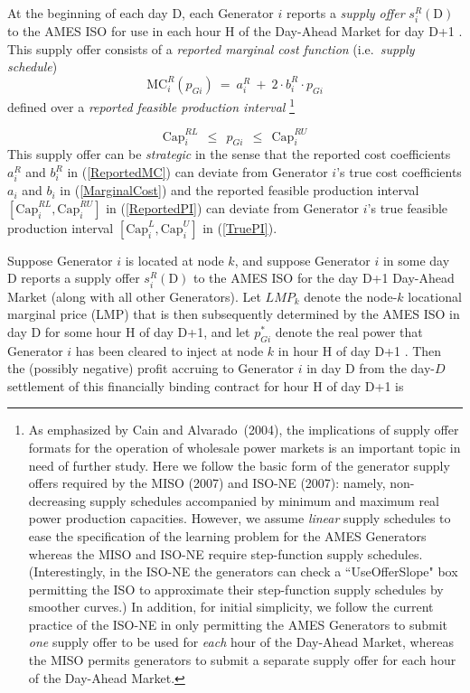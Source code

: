 \documentclass[12pt]{article}
\begin{document}
At the beginning of each day D, each Generator $i$ reports a \textit{supply offer\/} $s^R_i(\mbox{D})$ to the AMES ISO for use in each hour H of the Day-Ahead Market for day D+1 .  This supply offer consists of a \textit{reported marginal cost function\/} (i.e.\ \textit{supply schedule\/})
                 \begin{equation} \label{ReportedMC}
     \mbox{MC}^R_i(p_{Gi}) ~ = ~ a^R_i  ~+~ 2\cdot b^R_i\cdot p_{Gi}
                      \end{equation}
defined over a \textit{reported feasible production interval\/}%
          \footnote{As emphasized by Cain and Alvarado~(2004), the implications of supply offer formats for the operation of wholesale power markets is an important topic in need of further study.  Here we follow the basic form of the generator supply offers required by the MISO (2007) and ISO-NE (2007): namely, non-decreasing supply schedules accompanied by minimum and maximum real power production capacities.  However, we assume \textit{linear\/} supply schedules to ease the specification of the learning problem for the AMES Generators whereas the MISO and ISO-NE require step-function supply schedules. (Interestingly, in the ISO-NE the generators can check a ``UseOfferSlope" box permitting the ISO to approximate their step-function supply schedules by smoother curves.) In addition, for initial simplicity, we follow the current practice of the ISO-NE in only permitting the AMES Generators to submit \textit{one\/} supply offer to be used for \textit{each\/} hour of the Day-Ahead Market, whereas the MISO permits generators to submit a separate supply offer for each hour of the Day-Ahead Market.}
 
                  \begin{equation} \label{ReportedPI}
     \mbox{Cap}^{RL}_{i} ~~ \le ~~ p_{Gi} ~~ \le ~~ \mbox{Cap}^{RU}_{i}
                  \end{equation}
  This supply offer can be \textit{strategic\/} in the sense that the reported cost coefficients $a^R_i$ and $b^R_i$ in 
(\ref{ReportedMC}) can deviate from Generator $i$'s true cost coefficients $a_i$ and $b_i$ in (\ref{MarginalCost}) and the reported feasible production interval $[\mbox{Cap}^{RL}_i,\mbox{Cap}^{RU}_i]$ in (\ref{ReportedPI}) can deviate from Generator $i$'s true feasible production interval $[\mbox{Cap}^{L}_i,\mbox{Cap}^{U}_i]$ in (\ref{TruePI}).
         
Suppose Generator $i$ is located at node $k$, and suppose Generator $i$ in some day D reports a supply 
offer $s^R_i(\mbox{D})$ to the AMES ISO for the day D+1 Day-Ahead Market (along with all other Generators).  Let $LMP_k$ denote the node-$k$ locational marginal price (LMP) that is then subsequently determined by the AMES ISO in day D for some hour H of day D+1, and let $p^\ast_{Gi}$ denote the real power that Generator $i$ has been 
cleared to inject at node $k$ in hour H of day D+1 .  Then the (possibly negative) profit accruing to Generator $i$ in day D from the day-$D$ settlement of this financially binding contract for hour H of day D+1  is
\end{document}
